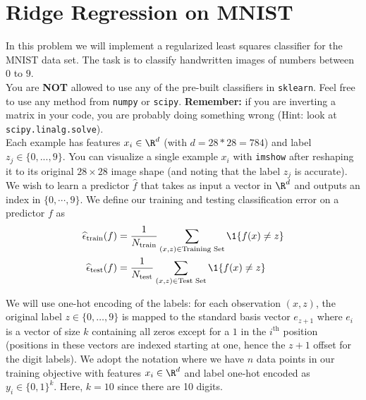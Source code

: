 \documentclass{article}
\begin{document}
\section*{Ridge Regression on MNIST}
\begin{aprob}
    In this problem we will implement a regularized least squares classifier for the MNIST data set. The task
    is to classify handwritten images of numbers between $0$ to $9$.\\
    
    You are \textbf{NOT} allowed to use any of the pre-built  classifiers in \verb|sklearn|.  Feel free to use any method from \verb|numpy| or \verb|scipy|. {\bf Remember:} if you are inverting a matrix in your code, you are probably doing something wrong (Hint: look at \verb|scipy.linalg.solve|).\\

    Each example has features $x_i \in \R^d$ (with $d=28*28=784$) and label $z_j \in \{0,...,9\}$. You can visualize a single example $x_i$ with \texttt{imshow} after reshaping it to its original $28 \times 28$ image shape (and noting that the label $z_j$ is accurate). We wish to learn a predictor $\widehat{f}$ that takes as input a vector in $\R^d$ and outputs an index in $\{0,\cdots,9\}$. We define our training and testing classification error on a predictor $f$ as
    \begin{align*}
        \widehat{\epsilon}_{\textrm{train}}(f) &=
        \frac{1}{N _{\textrm{train}}} \sum_{(x,z)\in \textrm{Training Set}}     \1\{ f(x) \neq z \}
        \\
          \widehat{\epsilon}_{\textrm{test}}(f) &=
          \frac{1}{N _{\textrm{test}}} \sum_{(x,z)\in \textrm{Test Set}}     \1\{ f(x) \neq z \} 
    \end{align*}
    
    We will use one-hot encoding of the labels: for each observation $(x,z)$, the original label $z \in \{0, \ldots, 9\}$ is mapped to the standard basis vector $e_{z+1}$ where $e_i$ is a vector of size $k$ containing all zeros except for a $1$ in the $i^{\textrm{th}}$ position (positions in these vectors are indexed starting at one, hence the $z+1$ offset for the digit labels). We adopt the notation where we have $n$ data points in our training objective with features $x_i \in \R^d$ and label one-hot encoded as $y_i \in \{0,1\}^k$. Here, $k=10$ since there are 10 digits.
    

\end{aprob}
\end{document}
